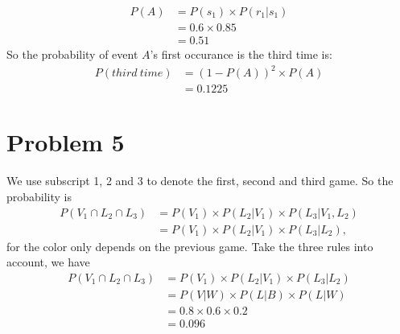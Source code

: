 \documentclass[12pt,letterpaper]{article}
\begin{document}
        \begin{equation}
            \begin{aligned}
                P(A) &= P(s_1) \times P(r_1 | s_1) \\
                &= 0.6 \times 0.85 \\
                &= 0.51
            \end{aligned}
        \end{equation}
    So the probability of event $A$'s first occurance is the third time is:
        \begin{equation}
            \begin{aligned}
                P(third\ time) &= (1 - P(A))^{2} \times P(A) \\
                &= 0.1225
            \end{aligned}
        \end{equation}

\section*{Problem 5}
    We use subscript 1, 2 and 3 to denote the first, second and third game. So the probability is
        \begin{equation}
            \begin{aligned}
                P(V_1 \cap L_2 \cap L_3) &= P(V_1) \times P(L_2 | V_1) \times P(L_3 | V_1, L_2) \\
                &= P(V_1) \times P(L_2 | V_1) \times P(L_3 | L_2),
            \end{aligned}
        \end{equation}
    for the color only depends on the previous game. Take the three rules into account, we have
        \begin{equation}
            \begin{aligned}
                P(V_1 \cap L_2 \cap L_3) &= P(V_1) \times P(L_2 | V_1) \times P(L_3 | L_2) \\
                &= P(V | W) \times P(L | B) \times P(L | W) \\
                &= 0.8 \times 0.6 \times 0.2 \\
                &= 0.096
            \end{aligned}
        \end{equation}
\end{document}
